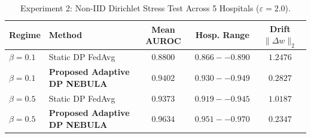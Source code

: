 \begin{table}[!t]
\centering
\caption{Experiment 2: Non-IID Dirichlet Stress Test Across 5 Hospitals ($\varepsilon=2.0$).}
\label{tab:exp2}
\begin{tabular}{llccc}
\toprule
\textbf{Regime} & \textbf{Method} & \textbf{Mean AUROC} & \textbf{Hosp. Range} & \textbf{Drift $\|\Delta w\|_2$} \\
\midrule
$\beta = 0.1$ & Static DP FedAvg & $0.8800$ & $0.866--0.890$ & $1.2476$ \\
$\beta = 0.1$ & \textbf{Proposed Adaptive DP NEBULA} & $\mathbf{0.9402}$ & $\mathbf{0.930--0.949}$ & $\mathbf{0.2827}$ \\
$\beta = 0.5$ & Static DP FedAvg & $0.9373$ & $0.919--0.945$ & $1.0187$ \\
$\beta = 0.5$ & \textbf{Proposed Adaptive DP NEBULA} & $\mathbf{0.9634}$ & $\mathbf{0.951--0.970}$ & $\mathbf{0.2347}$ \\
\bottomrule
\end{tabular}
\end{table}